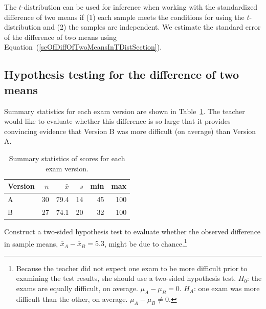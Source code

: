 \begin{termBox}{
The $t$-distribution can be used for inference when working with the standardized difference of two means if (1) each sample meets the conditions for using the $t$-distribution and (2) the samples are independent. We estimate the standard error of the difference of two means using Equation~(\ref{seOfDiffOfTwoMeansInTDistSection}).}
\end{termBox}

\subsection{Hypothesis testing for the difference of two means}


Summary statistics for each exam version are shown in Table~\ref{summaryStatsForTwoVersionsOfExams}. The teacher would like to evaluate whether this difference is so large that it provides convincing evidence that Version B was more difficult (on average) than Version A.

\begin{table}[hht]
\centering
\begin{tabular}{l rrrrr}
\hline
Version\hspace{2mm}	& $n$	& $\bar{x}$	& $s$	& min	& max  \\
\hline
A		& 30		& 79.4		& 14 	& 45		& 100 \\
B		& 27		& 74.1		& 20		& 32		& 100 \\
\hline
\end{tabular}
\caption{Summary statistics of scores for each exam version.}
\label{summaryStatsForTwoVersionsOfExams}
\end{table}

\begin{exercise} \label{htSetupForEvaluatingTwoExamVersions}
Construct a two-sided hypothesis test to evaluate whether the observed difference in sample means, $\bar{x}_A - \bar{x}_B=5.3$, might be due to chance.\footnote{Because the teacher did not expect one exam to be more difficult prior to examining the test results, she should use a two-sided hypothesis test. $H_0$: the exams are equally difficult, on average. $\mu_A - \mu_B = 0$. $H_A$: one exam was more difficult than the other, on average. $\mu_A - \mu_B \neq 0$.}
\end{exercise}

